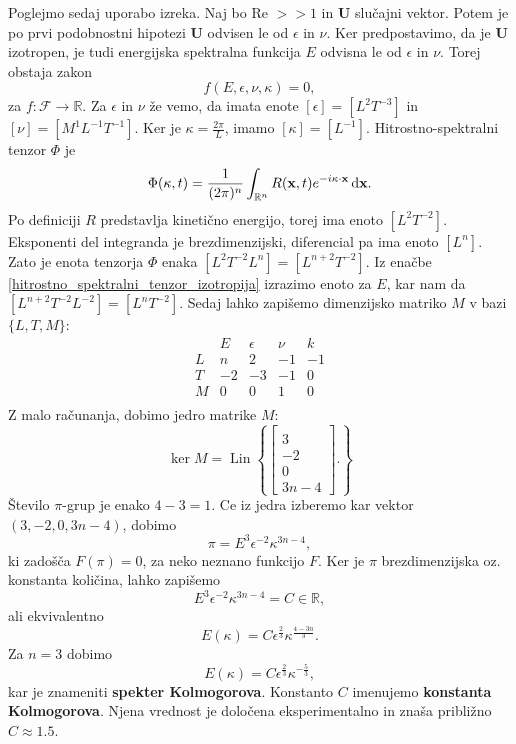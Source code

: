 \documentclass[mat2, tisk]{fmfdelo}
\newcommand{\R}{\mathbb R}
\newcommand{\bd}{\textbf}
\begin{document}
Poglejmo sedaj uporabo izreka. Naj bo Re $>\!\!> 1$ in $\bd{U}$ 
slučajni vektor. Potem je po prvi podobnostni hipotezi $\bd{U}$
odvisen le od $\epsilon$ in $\nu$. Ker predpostavimo, da je $\bd{U}$
izotropen, je tudi energijska spektralna funkcija $E$ odvisna le 
od $\epsilon$ in $\nu$. Torej obstaja zakon 
$$
f(E, \epsilon, \nu, \kappa) = 0,
$$
za $f:\mathcal{F} \rightarrow \R$. Za $\epsilon$ in $\nu$ že vemo, da imata
enote $[\epsilon] = [L^2 T^{-3}]$ in $[\nu] = [M^1 L^{-1}T^{-1}]$. Ker je 
$\kappa = \frac{2\pi}{L}$, imamo $[\kappa] = [L^{-1}]$.
Hitrostno-spektralni tenzor $\Phi$ je 
$$
\Phi(\text{\bd{$\kappa$}}, t) = \frac{1}{(2\pi)^n} \int_{\R^n} {R}(\bd{x}, t) e^{-i\text{\bd{$\kappa$}} \cdot \bd{x}} \dif \bd{x}.
$$
Po definiciji $R$ predstavlja kinetično energijo, torej ima enoto $[L^2T^{-2}]$.
Eksponenti del integranda je brezdimenzijski, diferencial pa ima enoto $[L^{n}]$. Zato je enota
tenzorja $\Phi$ enaka $[L^2T^{-2}L^n] = [L^{n+2}T^{-2}]$. Iz 
enačbe \eqref{hitrostno_spektralni_tenzor_izotropija} izrazimo enoto za 
$E$, kar nam da $[L^{n+2} T^{-2} L^{-2}] = [L^n T^{-2}]$. Sedaj lahko 
zapišemo dimenzijsko matriko $M$ v bazi $\{L, T, M\}$:
\[
\begin{array}{c|rrrr}
 & E & \epsilon & \nu & k \\[-3mm]
\hline
L & n & 2 & -1 & -1 \\[-3mm]
T & -2 & -3 & -1 & 0\\[-3mm]
M & 0 & 0 & 1 & 0 \\
\end{array}
\]
Z malo računanja, dobimo jedro matrike $M$:
$$
\operatorname{ker} M = \operatorname{Lin} \left\{ 
\begin{bmatrix} 
\\[-17mm]
3 \\[-5mm]
-2 \\[-5mm]
0 \\[-5mm]
3n - 4 
\end{bmatrix} .
\right\}$$
Število $\pi$-grup je enako $4 - 3 = 1$. Ce iz jedra izberemo kar vektor $(3, -2, 0, 3n-4)$,
dobimo
$$
\pi = E^{3} \epsilon^{-2} \kappa^{3n - 4}, 
$$
ki zadošča $F(\pi) = 0$, za neko neznano funkcijo $F$. Ker je $\pi$ brezdimenzijska
oz. konstanta količina, lahko zapišemo
\begin{equation*}
  E^{3} \epsilon^{-2} \kappa^{3n - 4} = C \in \R,
\end{equation*}
ali ekvivalentno 
\begin{equation*}
  E(\kappa) = C \epsilon^{\frac{2}{3}} \kappa^{\frac{4 - 3n}{3}}.
\end{equation*}
Za $n=3$ dobimo 
\begin{equation*}
E(\kappa) = C \epsilon^{\frac{2}{3}} \kappa^{-\frac{5}{3}},
\end{equation*}
kar je znameniti \textbf{spekter Kolmogorova}. Konstanto $C$ imenujemo 
\textbf{konstanta Kolmogorova}. Njena vrednost je določena eksperimentalno
in znaša približno $C \approx 1.5$.
\end{document}
